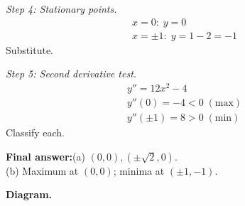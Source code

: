 \documentclass[11pt]{article}
\begin{document}
\textit{Step 4: Stationary points.}
\[\begin{gathered}
x = 0: \; y = 0 \\ x = \pm 1: \; y = 1 - 2 = -1
\end{gathered}\]
Substitute.

\textit{Step 5: Second derivative test.}
\[\begin{gathered}
y'' = 12x^2 - 4 \\ y''(0) = -4 < 0\; (\text{max}) \\ y''(\pm 1) = 8 > 0\; (\text{min})
\end{gathered}\]
Classify each.

\begin{answerbox}
\textbf{Final answer:}\quad (a) \(\displaystyle  (0, 0), (\pm\sqrt{2}, 0) \). \\[3pt]  (b) Maximum at \(\displaystyle  (0, 0) \); minima at \(\displaystyle  (\pm 1, -1) \).
\end{answerbox}
\textbf{Diagram.}
\end{document}
